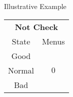 \documentclass[usenames,dvipsnames,aspectratio=169,11pt, envcountsect, handout]{beamer}
\begin{document}
\begin{frame}[noframenumbering]{Illustrative Example}
\begin{table}[H]
\begin{minipage}{0.29\textwidth}
			\centering
			\begin{tabular}{c | c}
				\multicolumn{2}{c}{\textbf{Not Check}} \\
				State  & Menus                         \\
				\hline
				Good   & \multirow{3}{*}{ \( 0 \)}     \\
				Normal &                               \\
				Bad    &                               \\
			\end{tabular}
			\vspace{0.5cm} %
		\end{minipage}
	\end{table}

\end{frame}
\end{document}
